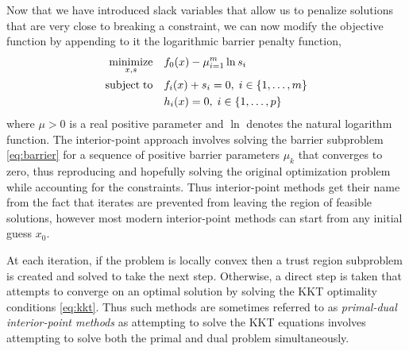 Now that we have introduced slack variables that allow us to penalize solutions that are very close to breaking a constraint, we can now modify the objective function by appending to it the logarithmic barrier penalty function,
\begin{align} \label{eq:barrier}
\operatornamewithlimits{minimize}_{x,s}\quad &
f_0(x) - \mu \sum_{i=1}^m \ln s_i \nonumber \\
\mathrm{subject\;to} \quad &
f_i(x) + s_i = 0, \; i \in \left\{1, \dots, m \right\} \\
& h_i(x) = 0, \; i \in \left\{1, \dots, p \right\} \nonumber
\end{align}
where $\mu > 0$ is a real positive parameter and $\ln$ denotes the natural logarithm function. The interior-point approach involves solving the barrier subproblem \eqref{eq:barrier} for a sequence of positive barrier parameters $\mu_k$ that converges to zero, thus reproducing and hopefully solving the original optimization problem while accounting for the constraints. Thus interior-point methods get their name from the fact that iterates are prevented from leaving the region of feasible solutions, however most modern interior-point methods can start from any initial guess $x_0$.

At each iteration, if the problem is locally convex then a trust region subproblem is created and solved to take the next step. Otherwise, a direct step is taken that attempts to converge on an optimal solution by solving the KKT optimality conditions \eqref{eq:kkt}. Thus such methods are sometimes referred to as \emph{primal-dual interior-point methods} as attempting to solve the KKT equations involves attempting to solve both the primal and dual problem simultaneously.


